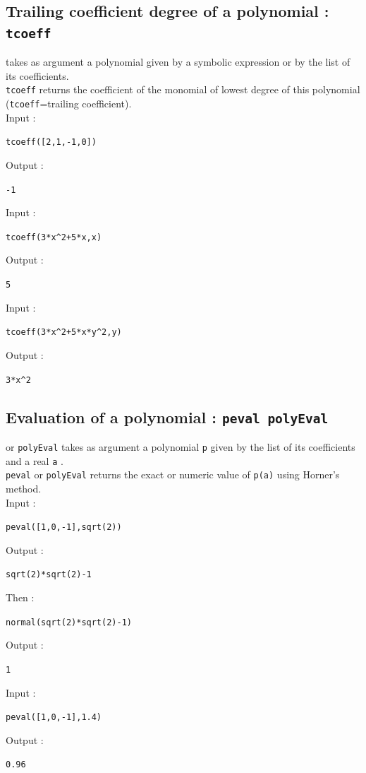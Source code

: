 \documentclass[a4paper,11pt]{book}
\begin{document}
\subsection{Trailing coefficient degree of a polynomial : {\tt tcoeff}}
  takes as argument a polynomial given by a
symbolic expression 
or by the list of its coefficients.\\
{\tt tcoeff}  returns the coefficient of the monomial of lowest degree 
of this polynomial ({\tt tcoeff}=trailing coefficient).\\
Input :
\begin{center}{\tt tcoeff([2,1,-1,0])}\end{center}
Output :
\begin{center}{\tt  -1}\end{center}
 Input :
\begin{center}{\tt tcoeff(3*x\verb|^|2+5*x,x)}\end{center}
Output :
\begin{center}{\tt  5}\end{center}
 Input :
\begin{center}{\tt tcoeff(3*x\verb|^|2+5*x*y\verb|^|2,y)}\end{center}
Output :
\begin{center}{\tt  3*x\verb|^|2}\end{center}

\subsection{Evaluation of a polynomial : {\tt peval polyEval}}
 or {\tt polyEval} takes as argument a polynomial 
{\tt p} given by the list of its coefficients and a real {\tt a} .\\
{\tt peval} or {\tt polyEval} returns the exact or numeric value of 
{\tt p(a)} using Horner's method.\\ 
 Input :
\begin{center}{\tt peval([1,0,-1],sqrt(2))}\end{center}
Output :
\begin{center}{\tt sqrt(2)*sqrt(2)-1}\end{center} 
Then :
\begin{center}{\tt normal(sqrt(2)*sqrt(2)-1)}\end{center} 
Output :
\begin{center}{\tt {\tt 1}}\end{center} 
Input :
\begin{center}{\tt peval([1,0,-1],1.4)}\end{center}
Output :
\begin{center}{\tt  0.96}\end{center} 
\end{document}
